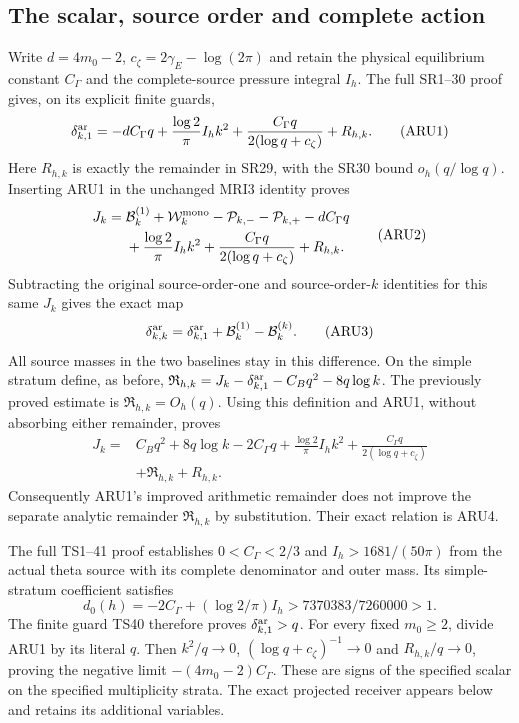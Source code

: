 \documentclass[11pt,a4paper]{article}
\begin{document}
\subsection{The scalar, source order and complete action}
Write $d=4m_0-2$, $c_\zeta=2\gamma_E-\log(2\pi)$ and retain the physical
equilibrium constant $C_\Gamma$ and the complete-source pressure integral
$I_h$. The full SR1--30 proof gives, on its explicit finite guards,
\[
 \delta_{k,1}^{\rm ar}=-dC_\Gamma q+
 \frac{\log2}{\pi}I_hk^2+
 \frac{C_\Gamma q}{2(\log q+c_\zeta)}+R_{h,k}.
 \tag{ARU1}
\]
Here $R_{h,k}$ is exactly the remainder in SR29, with the SR30 bound
$o_h(q/\log q)$. Inserting ARU1 in the unchanged MRI3 identity proves
\[
\begin{split}
 J_k={}&\mathcal B_k^{(1)}+\mathcal W_k^{\rm mono}
 -\mathcal P_{k,-}-\mathcal P_{k,+}-dC_\Gamma q\\
 &+\frac{\log2}{\pi}I_hk^2+
 \frac{C_\Gamma q}{2(\log q+c_\zeta)}+R_{h,k}.
\end{split}\tag{ARU2}
\]
Subtracting the original source-order-one and source-order-$k$ identities
for this same $J_k$ gives the exact map
\[
 \delta_{k,k}^{\rm ar}=\delta_{k,1}^{\rm ar}
                   +\mathcal B_k^{(1)}-\mathcal B_k^{(k)}.
 \tag{ARU3}
\]
All source masses in the two baselines stay in this difference. On the
simple stratum define, as before,
$\mathfrak R_{h,k}=J_k-\delta_{k,1}^{\rm ar}-C_Bq^2-8q\log k$.
The previously proved estimate is $\mathfrak R_{h,k}=O_h(q)$.
Using this definition and ARU1, without absorbing either remainder,
proves
\[
\begin{split}
 J_k={}&C_Bq^2+8q\log k-2C_\Gamma q+
 \frac{\log2}{\pi}I_hk^2+
 \frac{C_\Gamma q}{2(\log q+c_\zeta)}\\
 &+\mathfrak R_{h,k}+R_{h,k}.
\end{split}\tag{ARU4}
\]
Consequently ARU1's improved arithmetic remainder does not improve
the separate analytic remainder $\mathfrak R_{h,k}$ by substitution.
Their exact relation is ARU4.

The full TS1--41 proof establishes $0<C_\Gamma<2/3$ and
$I_h>1681/(50\pi)$ from the actual theta source with its complete
denominator and outer mass. Its simple-stratum coefficient satisfies
\[
 d_0(h)=-2C_\Gamma+(\log2/\pi)I_h
       >7370383/7260000>1.
 \tag{ARU5}
\]
The finite guard TS40 therefore proves $\delta_{k,1}^{\rm ar}>q$.
For every fixed $m_0\ge2$, divide ARU1 by its literal $q$.
Then $k^2/q\to0$, $(\log q+c_\zeta)^{-1}\to0$ and
$R_{h,k}/q\to0$, proving the negative limit
$-(4m_0-2)C_\Gamma$. These are signs of the specified scalar on the
specified multiplicity strata. The exact projected receiver appears
below and retains its additional variables.
\end{document}
